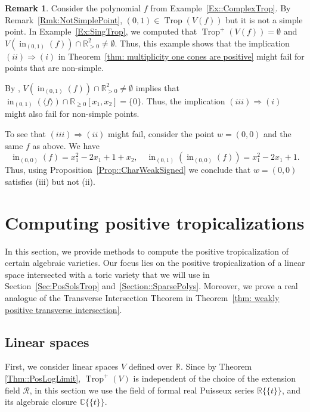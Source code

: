 \documentclass{article}
\theoremstyle{definition}
\newtheorem{remark}[theorem]{Remark}
\DeclareMathOperator{\initial}{in}
\DeclareMathOperator{\Trop}{Trop}
\begin{document}
    \begin{remark}
    Consider the polynomial $f$ from Example~\ref{Ex::ComplexTrop}. By Remark~\ref{Rmk:NotSimplePoint}, $(0,1) \in \Trop(V(f))$ but it is not a simple point. 
    In Example~\ref{Ex:SingTrop}, we computed that $\Trop^+(V(f)) = \emptyset$ and $V(\initial_{(0,1)}(f)) \cap \mathbb{R}^2_{>0} \neq \emptyset$. Thus, this example shows that the implication $(ii) \Rightarrow (i)$ in Theorem~\ref{thm: multiplicity one cones are positive}  might fail for points that are non-simple.

    By ,  $V(\initial_{(0,1)}(f)) \cap \mathbb{R}^2_{>0} \neq \emptyset$ implies that  $\initial_{(0,1)}(\langle f\rangle) \cap \mathbb{R}_{\geq 0}[x_1,x_2] = \{ 0 \} $. Thus, the implication $(iii) \Rightarrow (i)$ might also fail for non-simple points.

     To see that $(iii) \Rightarrow (ii)$ might fail, consider the point $w=(0,0)$ and the same $f$ as above. We have 
     \[ \initial_{(0,0)}(f) = x_1^2-2x_1+1+x_2, \quad \initial_{(0,1)}( \initial_{(0,0)}(f)) = x_1^2-2x_1+1.\]
      Thus, using Proposition~\ref{Prop::CharWeakSigned}  we conclude that $w=(0,0)$ satisfies (iii) but not (ii).
    \end{remark} 





\section{Computing positive tropicalizations}
\label{Sec::Comp}
In this section, we provide methods to compute the positive tropicalization of certain algebraic varieties. Our focus lies on the positive tropicalization of a linear space intersected with a toric variety that we will use in Section~\ref{Sec:PosSolsTrop} and~\ref{Section::SparsePolys}. Moreover, we prove a real analogue of the Transverse Intersection Theorem in Theorem~\ref{thm: weakly positive transverse intersection}.
 
\subsection{Linear spaces}
\label{Sec::LinearSpaces}
First, we consider linear spaces $V$ defined over $\mathbb{R}$. Since by Theorem \ref{Thm::PosLogLimit}, $\Trop^+(V)$ is independent of the choice of the extension field $\mathcal{R}$, in this section we use the field of formal real Puisseux series $\mathbb{R}\{\!\{t \}\!\}$, and its algebraic closure $\mathbb{C}\{\!\{t \}\!\}$.
\end{document}
